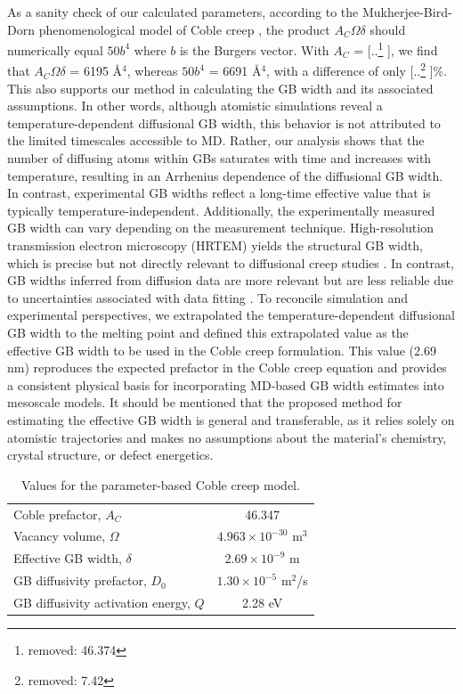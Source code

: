 \documentclass[preprint,12pt,sort&compress]{elsarticle} %
\newcommand{\?}{\stackrel{?}{=}}
\providecommand{\DIFaddtex}[1]{{\sf #1}} %
\providecommand{\DIFdeltex}[1]{{[..\footnote{removed: #1} ]}} %
\providecommand{\DIFaddbegin}{\protect\color{blue}} %
\providecommand{\DIFaddend}{\protect\color{black}} %
\providecommand{\DIFdelbegin}{\protect\color{red}} %
\providecommand{\DIFdelend}{\protect\color{black}} %
\providecommand{\DIFadd}[1]{\texorpdfstring{\DIFaddtex{#1}}{#1}} %
\providecommand{\DIFdel}[1]{\texorpdfstring{\DIFdeltex{#1}}{}} %
\newcommand{\DIFscaledelfig}{0.5}
\newlength{\DIFdelgraphicswidth} %
\newlength{\DIFdelgraphicsheight} %
\newcommand{\DIFaddincludegraphics}[2][]{{\color{blue}\fbox{\DIFOincludegraphics[#1]{#2}}}} %
\newcommand{\DIFdelincludegraphics}[2][]{%
\sbox{\DIFdelgraphicsbox}{\DIFOincludegraphics[#1]{#2}}%
\settoboxwidth{\DIFdelgraphicswidth}{\DIFdelgraphicsbox} %
\settoboxtotalheight{\DIFdelgraphicsheight}{\DIFdelgraphicsbox} %
\scalebox{\DIFscaledelfig}{%
\parbox[b]{\DIFdelgraphicswidth}{\usebox{\DIFdelgraphicsbox}\\[-\baselineskip] \rule{\DIFdelgraphicswidth}{0em}}\llap{\resizebox{\DIFdelgraphicswidth}{\DIFdelgraphicsheight}{%
\setlength{\unitlength}{\DIFdelgraphicswidth}%
\begin{picture}(1,1)%
\thicklines\linethickness{2pt} %
{\color[rgb]{1,0,0}\put(0,0){\framebox(1,1){}}}%
{\color[rgb]{1,0,0}\put(0,0){\line( 1,1){1}}}%
{\color[rgb]{1,0,0}\put(0,1){\line(1,-1){1}}}%
\end{picture}%
}\hspace*{3pt}}} %
} %
\DeclareRobustCommand{\DIFaddbegin}{\DIFOaddbegin \let\includegraphics\DIFaddincludegraphics} %
\DeclareRobustCommand{\DIFaddend}{\DIFOaddend \let\includegraphics\DIFOincludegraphics} %
\DeclareRobustCommand{\DIFdelbegin}{\DIFOdelbegin \let\includegraphics\DIFdelincludegraphics} %
\DeclareRobustCommand{\DIFdelend}{\DIFOaddend \let\includegraphics\DIFOincludegraphics} %
\begin{document}
As a sanity check of our calculated parameters, according to the Mukherjee-Bird-Dorn phenomenological model of Coble creep \cite{Mukherjee2002}, the product $A_C \Omega \delta$ should numerically equal $50b^4$ where $b$ is the Burgers vector. With $A_C$ = \DIFdelbegin \DIFdel{46.374}\DIFdelend \DIFaddbegin \DIFadd{46.347}\DIFaddend , we find that $A_C \Omega \delta$ = 6195 \AA$^4$, whereas $50b^4$ = 6691 \AA$^4$, with a difference of only \DIFdelbegin \DIFdel{7.42}\DIFdelend \DIFaddbegin \DIFadd{7.52}\DIFaddend \%. This also supports our method in calculating the GB width and its associated assumptions. \DIFaddbegin \DIFadd{In other words, although atomistic simulations reveal a temperature-dependent diffusional GB width, this behavior is not attributed to the limited timescales accessible to MD. Rather, our analysis shows that the number of diffusing atoms within GBs saturates with time and increases with temperature, resulting in an Arrhenius dependence of the diffusional GB width. In contrast, experimental GB widths reflect a long-time effective value that is typically temperature-independent. Additionally, the experimentally measured GB width can vary depending on the measurement technique. High-resolution transmission electron microscopy (HRTEM) yields the structural GB width, which is precise but not directly relevant to diffusional creep studies \cite{Prokoshkina2013}. In contrast, GB widths inferred from diffusion data are more relevant but are less reliable due to uncertainties associated with data fitting \cite{Prokoshkina2013}. To reconcile simulation and experimental perspectives, we extrapolated the temperature-dependent diffusional GB width to the melting point and defined this extrapolated value as the effective GB width to be used in the Coble creep formulation. This value (2.69 nm) reproduces the expected prefactor in the Coble creep equation and provides a consistent physical basis for incorporating MD-based GB width estimates into mesoscale models. It should be mentioned that the proposed method for estimating the effective GB width is general and transferable, as it relies solely on atomistic trajectories and makes no assumptions about the material's chemistry, crystal structure, or defect energetics.
}\DIFaddend 

\begin{table}[h!]
\centering
\caption{Values for the parameter-based Coble creep model.}
\footnotesize
\begin{tabular}{lc}
\hline
Coble prefactor, $A_C$ & 46.347 \\
Vacancy volume, $\Omega$ & $4.963 \times 10^{-30}$ m$^3$ \\
Effective GB width, $\delta$ & $2.69 \times 10^{-9}$ m \\
GB diffusivity prefactor, $D_0$ & $1.30 \times 10^{-5}$ m$^2$/s \\
GB diffusivity activation energy, $Q$ & 2.28 eV \\
\hline
\end{tabular}
\label{Tab:Params}
\end{table}
\end{document}
